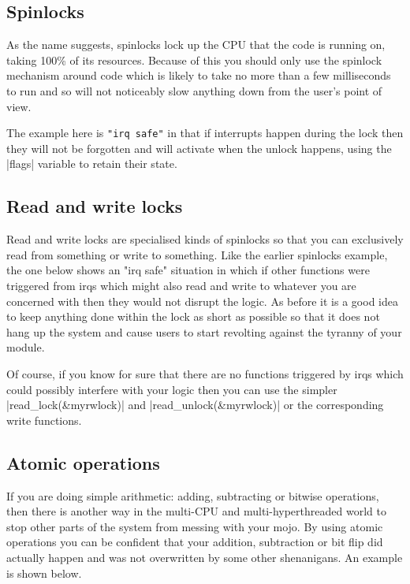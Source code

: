 \documentclass[10pt, oneside]{book}
\begin{document}

\subsection{Spinlocks}
\label{sec:spinlock}
As the name suggests, spinlocks lock up the CPU that the code is running on, taking 100\% of its resources.
Because of this you should only use the spinlock mechanism around code which is likely to take no more than a few milliseconds to run and so will not noticeably slow anything down from the user's point of view.

The example here is \verb|"irq safe"| in that if interrupts happen during the lock then they will not be forgotten and will activate when the unlock happens, using the \cpp|flags| variable to retain their state.


\subsection{Read and write locks}
\label{sec:rwlock}
Read and write locks are specialised kinds of spinlocks so that you can exclusively read from something or write to something.
Like the earlier spinlocks example, the one below shows an "irq safe" situation in which if other functions were triggered from irqs which might also read and write to whatever you are concerned with then they would not disrupt the logic.
As before it is a good idea to keep anything done within the lock as short as possible so that it does not hang up the system and cause users to start revolting against the tyranny of your module.


Of course, if you know for sure that there are no functions triggered by irqs which could possibly interfere with your logic then you can use the simpler \cpp|read_lock(&myrwlock)| and \cpp|read_unlock(&myrwlock)| or the corresponding write functions.
\subsection{Atomic operations}
\label{sec:atomics}
If you are doing simple arithmetic: adding, subtracting or bitwise operations, then there is another way in the multi-CPU and multi-hyperthreaded world to stop other parts of the system from messing with your mojo.
By using atomic operations you can be confident that your addition, subtraction or bit flip did actually happen and was not overwritten by some other shenanigans.
An example is shown below.
\end{document}
